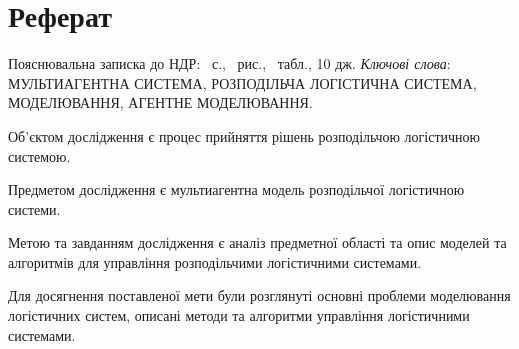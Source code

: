 \section*{Реферат}
Пояснювальна записка до НДР: \pageref{LastPage}~с., \totalfigures~рис., \totaltables~табл., 10 дж. \bigbreak
\textit{Ключові слова}: \MakeUppercase{мультиагентна система, розподільча логістична система, моделювання, агентне моделювання}. \bigbreak

Об'єктом дослідження є процес прийняття рішень розподільчою логістичною системою. 

Предметом дослідження є мультиагентна модель розподільчої логістичною системи.

Метою та завданням дослідження є аналіз предметної області та опис моделей та алгоритмів для управління розподільчими логістичними системами.

Для досягнення поставленої мети були розглянуті основні проблеми моделювання логістичних систем, описані методи та алгоритми управління логістичними системами.
